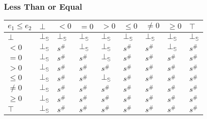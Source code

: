 \documentclass[aspectratio=169]{beamer}
\begin{document}
                        \begin{frame}
                            \frametitle{Less Than or Equal}
                        \begin{table}[]
                            \begin{tabular}{|l|l|l|l|l|l|l|l|l|}
                            \hline
                            $e_1 \le e_2$ & $\bot$ & $<0$   & $=0$   & $>0$   & $\le 0$ & $\ne 0$ & $\ge 0$ & $\top$ \\ \hline
                            $\bot$        & $\bot_\mathbb{S}$ & $\bot_\mathbb{S}$ & $\bot_\mathbb{S}$ & $\bot_\mathbb{S}$ & $\bot_\mathbb{S}$  & $\bot_\mathbb{S}$  & $\bot_\mathbb{S}$  & $\bot_\mathbb{S}$ \\ \hline
                            $<0$          & $\bot_\mathbb{S}$ & $s^\#$ & $\bot_\mathbb{S}$ & $\bot_\mathbb{S}$ & $s^\#$  & $s^\#$  & $\bot_\mathbb{S}$  & $s^\#$ \\ \hline
                            $=0$          & $\bot_\mathbb{S}$ & $s^\#$ & $s^\#$ & $\bot_\mathbb{S}$ & $s^\#$  & $s^\#$  & $s^\#$  & $s^\#$ \\ \hline
                            $>0$          & $\bot_\mathbb{S}$ & $s^\#$ & $s^\#$ & $s^\#$ & $s^\#$  & $s^\#$  & $s^\#$  & $s^\#$ \\ \hline
                            $\le 0$       & $\bot_\mathbb{S}$ & $s^\#$ & $s^\#$ & $\bot_\mathbb{S}$ & $s^\#$  & $s^\#$  & $s^\#$  & $s^\#$ \\ \hline
                            $\ne 0$       & $\bot_\mathbb{S}$ & $s^\#$ & $s^\#$ & $s^\#$ & $s^\#$  & $s^\#$  & $s^\#$  & $s^\#$ \\ \hline
                            $\ge 0$       & $\bot_\mathbb{S}$ & $s^\#$ & $s^\#$ & $s^\#$ & $s^\#$  & $s^\#$  & $s^\#$  & $s^\#$ \\ \hline
                            $\top$        & $\bot_\mathbb{S}$ & $s^\#$ & $s^\#$ & $s^\#$ & $s^\#$  & $s^\#$  & $s^\#$  & $s^\#$ \\ \hline
                            \end{tabular}
                            \end{table}
                        \end{frame}
\end{document}
